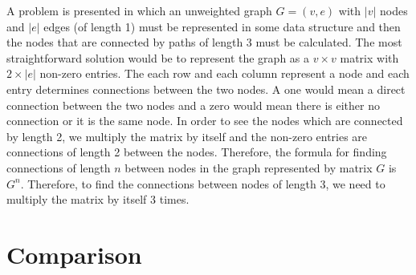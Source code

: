 \documentclass[journal, a4paper]{IEEEtran}
\begin{document}
\noindent
A problem is presented in which an unweighted graph $G=(v,e)$ with $|v|$ nodes and $|e|$ edges (of length 1) must be represented in some data structure and then the nodes that are connected by paths of length 3 must be calculated. The most straightforward solution would be to represent the graph as a $v\times v$ matrix with $2\times|e|$ non-zero entries. The each row and each column represent a node and each entry determines connections between the two nodes. A one would mean a direct connection between the two nodes and a zero would mean there is either no connection or it is the same node. In order to see the nodes which are connected by length 2, we multiply the matrix by itself and the non-zero entries are connections of length 2 between the nodes. Therefore, the formula for finding connections of length $n$ between nodes in the graph represented by matrix $G$ is $G^n$. Therefore, to find the connections between nodes of length 3, we need to multiply the matrix by itself 3 times.


\section{Comparison}
\end{document}
